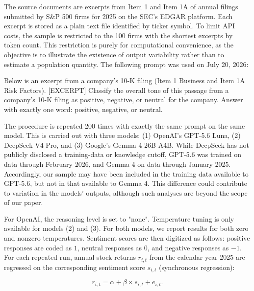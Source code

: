 \documentclass[11pt]{article}
\begin{document}
The source documents are excerpts from Item 1 and Item 1A of annual filings submitted by S\&P 500 firms for 2025 on the SEC's EDGAR platform. Each excerpt is stored as a plain text file identified by ticker symbol. To limit API costs, the sample is restricted to the 100 firms with the shortest excerpts by token count. This restriction is purely for computational convenience, as the objective is to illustrate the existence of output variability rather than to estimate a population quantity. The following prompt was used on July 20, 2026: \medskip

{\ttfamily\raggedright Below is an excerpt from a company's 10-K filing (Item 1 Business and Item 1A Risk Factors). [EXCERPT] Classify the overall tone of this passage from a company's 10-K filing as positive, negative, or neutral for the company. Answer with exactly one word: positive, negative, or neutral.\par}


\medskip

The procedure is repeated 200 times with exactly the same prompt on the same model.%
This is carried out with three models: (1) OpenAI's GPT-5.6 Luna, (2) DeepSeek V4-Pro, and (3) Google's Gemma 4 26B A4B. While DeepSeek has not publicly disclosed a training-data or knowledge cutoff, GPT-5.6 was trained on data through February 2026, and Gemma 4 on data through January 2025. Accordingly, our sample may have been included in the training data available to GPT-5.6, but not in that available to Gemma 4. This difference could contribute to variation in the models’ outputs, although such analyses are beyond the scope of our paper.\medskip

For OpenAI, the reasoning level is set to "none". Temperature tuning is only available for models (2) and (3). For both models, we report results for both zero and nonzero temperatures. Sentiment scores are then digitized as follows: positive responses are coded as $1$, neutral responses as $0$, and negative responses as $-1$. For each repeated run, annual stock returns $r_{i,t}$ from the calendar year 2025 are regressed on the corresponding sentiment score $s_{i,t}$ (synchronous regression):

\begin{equation}
r_{i,t} = \alpha + \beta \times  s_{i,t} + e_{i,t}.
    \label{eq:sentiment}
\end{equation}
\end{document}
